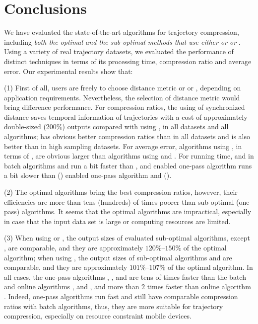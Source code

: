 \vspace{-1ex}
\section{Conclusions}

We have evaluated the state-of-the-art \lsa algorithms for trajectory compression, including \emph{both the optimal and the sub-optimal methods that use either \ped or \sed or \dad}.
Using a variety of real trajectory datasets, we evaluated the performance of distinct techniques in terms of its processing time, compression ratio and average error.
Our experimental results show that:

(1) First of all, users are freely to choose distance metric \sed or \ped or \dad, depending on application requirements. Nevertheless, the selection of distance metric would bring difference performance. 
For compression ratios, the using of synchronized distance \sed saves temporal information of trajectories with a cost of approximately double-sized (\ie $200\%$) outputs compared with using \ped, in all datasets and all algorithms; \ped has obvious better compression ratios than \dad in all datasets and \sed is also better than \dad in high sampling datasets.
For average error, algorithms using \dad, in terms of \ped, are obvious larger than algorithms using \ped and \sed.
For running time, \sed and \dad in batch algorithms \dpa and \tpa run a bit faster than \ped, and \sed enabled one-pass algorithm \cised runs a bit slower than \ped (\dad) enabled one-pass algorithm \siped and \operb (\interval).

(2) The optimal algorithms bring the best compression ratios, however, their efficiencies are more than tens (hundreds) of times poorer than sub-optimal (one-pass) algorithms. It seems that the optimal algorithms are impractical, especially in case that the input data set is large or computing resources are limited.

(3) When using \ped or \sed, the output sizes of evaluated sub-optimal algorithms, except \squishe, are comparable, and they are approximately $120\%$--$150\%$ of the optimal algorithm; when using \dad, the output sizes of sub-optimal algorithms \tpa and \interval are comparable, and they are approximately $101\%$--$107\%$ of the optimal algorithm. In all cases, the one-pass algorithms \siped, \operb, \cised and \interval are tens of times faster than the batch and online algorithms \tpa, \dpa and \bqsa, and more than $2$ times faster than online algorithm \squishe. Indeed, one-pass algorithms run fast and still have comparable compression ratios with batch algorithms, thus, they are more suitable for trajectory compression, especially on resource constraint mobile devices.

